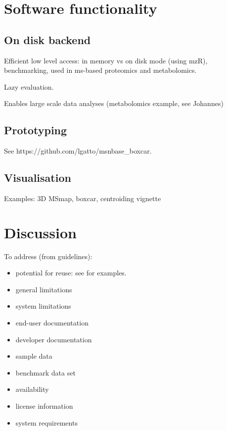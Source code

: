 \documentclass[journal=jacsat,manuscript=article]{achemso}\usepackage[]{graphicx}\usepackage[]{color}
\begin{document}
\section{Software functionality}


\subsection{On disk backend}

Efficient low level access: in memory vs on disk mode (using mzR),
benchmarking, used in ms-based proteomics and metabolomics.

Lazy evaluation.

Enables large scale data analyses (metabolomics example, see Johannes)

\subsection{Prototyping}

See https://github.com/lgatto/msnbase\_boxcar.

\subsection{Visualisation}

Examples: 3D MSmap, boxcar, centroiding vignette


\section{Discussion}

To address (from guidelines):

\begin{itemize}

\item{potential for reuse}: see
  \cite{Wieczorek:2017,Griss:2019,Smith:2006} for examples.
\item{general limitations}
\item{system limitations}
\item{end-user documentation}
\item{developer documentation}
\item{sample data}
\item{benchmark data set}
\item{availability}
\item{license information}
\item{system requirements}

\end{itemize}
\end{document}
